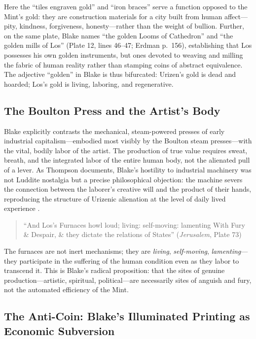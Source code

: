 \documentclass[
]{article}
\begin{document}
Here the ``tiles engraven gold'' and ``iron braces'' serve a function
opposed to the Mint's gold: they are construction materials for a city
built from human affect---pity, kindness, forgiveness, honesty---rather
than the weight of bullion. Further, on the same plate, Blake names
``the golden Looms of Cathedron'' and ``the golden mills of Los'' (Plate
12, lines 46--47; Erdman p.~156), establishing that Los possesses his
own golden instruments, but ones devoted to weaving and milling the
fabric of human reality rather than stamping coins of abstract
equivalence. The adjective ``golden'' in Blake is thus bifurcated:
Urizen's gold is dead and hoarded; Los's gold is living, laboring, and
regenerative.

\subsection{The Boulton Press and the Artist's
Body}\label{the-boulton-press-and-the-artists-body}

Blake explicitly contrasts the mechanical, steam-powered presses of
early industrial capitalism---embodied most visibly by the Boulton steam
presses---with the vital, bodily labor of the artist. The production of
true value requires sweat, breath, and the integrated labor of the
entire human body, not the alienated pull of a lever. As Thompson
documents, Blake's hostility to industrial machinery was not Luddite
nostalgia but a precise philosophical objection: the machine severs the
connection between the laborer's creative will and the product of their
hands, reproducing the structure of Urizenic alienation at the level of
daily lived experience \citep{thompson1993witness}.

\begin{quote}
``And Los's Furnaces howl loud; living: self-moving: lamenting With Fury
\& Despair, \& they dictate the relations of States'' (\emph{Jerusalem},
Plate 73) \citep{erdman1988complete}
\end{quote}

The furnaces are not inert mechanisms; they are \emph{living},
\emph{self-moving}, \emph{lamenting}---they participate in the suffering
of the human condition even as they labor to transcend it. This is
Blake's radical proposition: that the sites of genuine
production---artistic, spiritual, political---are necessarily sites of
anguish and fury, not the automated efficiency of the Mint.

\subsection{The Anti-Coin: Blake's Illuminated Printing as Economic
Subversion}\label{the-anti-coin-blakes-illuminated-printing-as-economic-subversion}
\end{document}
